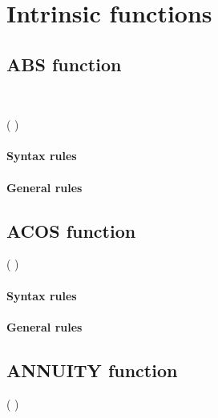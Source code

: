 \chapter{Intrinsic functions}

\section{ABS function}

\begin{syntax}
  \begin{1=}
     \\
  \end{1=}
  ( \argument )
\end{syntax}

\subsubsection{Syntax rules}

\subsubsection{General rules}

\section{ACOS function}

\begin{syntax}
    ( \argument)
\end{syntax}

\subsubsection{Syntax rules}

\subsubsection{General rules}

\section{ANNUITY function}

\begin{syntax}
    ( \argument \argument )
\end{syntax}

